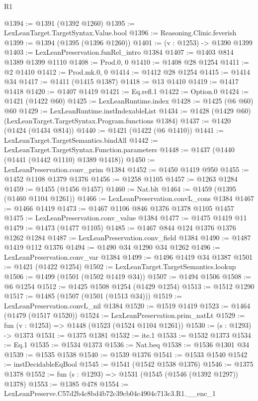 \begin{lexlean}{R1}
\begin{coremodule}
@1394 := @1391 (@1392 @1260)
@1395 := LexLeanTarget.TargetSyntax.Value.bool
@1396 := Reasoning.Clinic.feverish
@1399 := @1394 (@1395 (@1396 @1260))
@1401 := (v : @1253) -> @1390 @1399
@1403 := LexLeanPreservation.funRel_intro @1384
@1407 := @1403 @814 @1389 @1399 @1110
@1408 := Prod.{0, 0}
@1410 := @1408 @28 @1254
@1411 := @2 @1410
@1412 := Prod.mk.{0, 0}
@1414 := @1412 @28 @1254
@1415 := @1414 @34
@1417 := @1411 (@1415 @1387)
@1418 := @13 @1410
@1419 := @1417 @1418
@1420 := @1407 @1419
@1421 := Eq.refl.{1}
@1422 := Option.{0}
@1424 := @1421 (@1422 @60)
@1425 := LexLeanRuntime.index
@1428 := @1425 (@6 @60) @60
@1429 := LexLeanRuntime.instIndexableList
@1434 := @1428 (@1429 @60) (LexLeanTarget.TargetSyntax.Program.functions @1384)
@1437 := @1420 (@1424 (@1434 @814))
@1440 := @1421 (@1422 (@6 @1410))
@1441 := LexLeanTarget.TargetSemantics.bindAll
@1442 := LexLeanTarget.TargetSyntax.Function.parameters
@1448 := @1437 (@1440 (@1441 (@1442 @1110) @1389 @1418))
@1450 := LexLeanPreservation.conv_prim @1384
@1452 := @1450 @1419 @950
@1455 := @1452 @1108 @1379 @1376
@1456 := @1258 @1105
@1457 := @1263 @1284
@1459 := @1455 (@1456 @1457)
@1460 := Nat.blt
@1464 := @1459 (@1395 (@1460 @1104 @1261))
@1466 := LexLeanPreservation.convL_cons @1384
@1467 := @1466 @1419
@1473 := @1467 @1106 @846 @1376 @1378 @1105 @1457
@1475 := LexLeanPreservation.conv_value @1384
@1477 := @1475 @1419 @11
@1479 := @1473 (@1477 @1105)
@1485 := @1467 @844 @124 @1376 @1376 @1262 @1284
@1487 := LexLeanPreservation.conv_field @1384
@1490 := @1487 @1419 @112 @1376
@1494 := @1490 @34 @1290 @34 @1262
@1496 := LexLeanPreservation.conv_var @1384
@1499 := @1496 @1419 @34 @1387
@1501 := @1421 (@1422 @1254)
@1502 := LexLeanTarget.TargetSemantics.lookup
@1506 := @1499 (@1501 (@1502 @1419 @34))
@1507 := @1494 @1506
@1508 := @6 @1254
@1512 := @1425 @1508 @1254 (@1429 @1254)
@1513 := @1512 @1290
@1517 := @1485 (@1507 (@1501 (@1513 @34)))
@1519 := LexLeanPreservation.convL_nil @1384
@1520 := @1519 @1419
@1523 := @1464 (@1479 (@1517 @1520))
@1524 := LexLeanPreservation.prim_natLt
@1529 := fun (v : @1253) => @1448 (@1523 (@1524 @1104 @1261))
@1530 := (s : @1293) -> @1373
@1531 := @1375 @1381
@1532 := ite.{1}
@1533 := @1532 @1373
@1534 := Eq.{1}
@1535 := @1534 @1373
@1536 := Nat.beq
@1538 := @1536 @1301 @34
@1539 := @1535 @1538
@1540 := @1539 @1376
@1541 := @1533 @1540
@1542 := instDecidableEqBool
@1545 := @1541 (@1542 @1538 @1376)
@1546 := @1375 @1378
@1552 := fun (s : @1293) => @1531 (@1545 (@1546 (@1392 @1297)) @1378)
@1553 := @1385 @478
@1554 := LexLeanPreserve.C57d2b4c8bd4b72c39cb04c4904c713c3.R1.__enc_1

\end{coremodule}
\end{lexlean}
